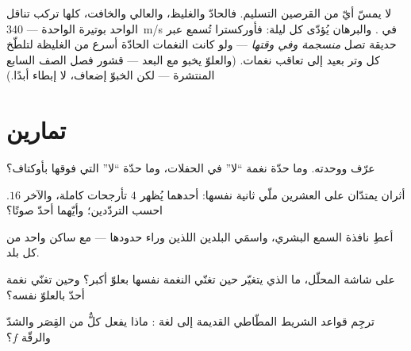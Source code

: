 \begin{example}\label{ex:g8:sound-pitch-loudness:speed}
لا يمسّ أيّ من القرصين التسليم. فالحادّ والغليظ، والعالي
والخافت، كلها تركب تناقل  الواحد بوتيرة  الواحدة ---
\qty{340}{m/s} في . والبرهان يُؤدّى كل ليلة: فأوركسترا
تُسمع عبر حديقة تصل \emph{منسجمة وفي وقتها} --- ولو كانت
النغمات الحادّة أسرع من الغليظة لتلطّخ كل وتر بعيد إلى تعاقب
نغمات. (والعلوّ يخبو مع البعد --- قشور فصل الصف السابع
المنتشرة --- لكن الخبوّ إضعاف، لا إبطاء أبدًا.)
\end{example}

\section{تمارين}

\begin{exercise}[$\star$]\label{exo:g8:sound-pitch-loudness:1}
عرّف  ووحدته. وما حدّة نغمة ``لا'' في الحفلات، وما
حدّة ``لا'' التي فوقها بأوكتاف؟
\end{exercise}

\begin{exercise}[$\star$]\label{exo:g8:sound-pitch-loudness:2}
أثران يمتدّان على العشرين ملّي ثانية نفسها: أحدهما يُظهر $4$
تأرجحات كاملة، والآخر $16$. احسب التردّدين؛ وأيّهما أحدّ
صوتًا؟
\end{exercise}

\begin{exercise}[$\star$]\label{exo:g8:sound-pitch-loudness:3}
أعطِ نافذة السمع البشري، واسمَي البلدين اللذين وراء حدودها ---
مع ساكن واحد من كل بلد.
\end{exercise}

\begin{exercise}[$\star$]\label{exo:g8:sound-pitch-loudness:4}
على شاشة المحلّل، ما الذي يتغيّر حين تغنّي النغمة نفسها
بعلوّ أكبر؟ وحين تغنّي نغمة أحدّ بالعلوّ نفسه؟
\end{exercise}

\begin{exercise}[$\star$]\label{exo:g8:sound-pitch-loudness:5}
ترجِم قواعد الشريط المطّاطي القديمة إلى لغة : ماذا يفعل
كلٌّ من القِصَر والشدّ والرقّة  $f$؟
\end{exercise}


